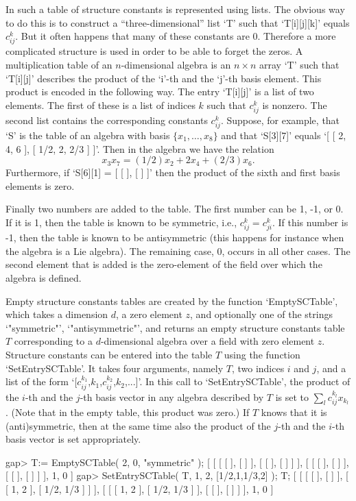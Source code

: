 In {\GAP} such a table of structure constants is represented using 
lists. The obvious way to do this
is to construct a ``three-dimensional'' list `T' such that  
`T[i][j][k]' equals
$c_{ij}^k$. But it often happens that many of these constants are 0.
Therefore a more complicated structure is used in order to be able to 
forget 
the zeros. A multiplication table of an $n$-dimensional algebra is an 
$n\times n$ array `T' such that `T[i][j]' describes the product
of the `i'-th and the `j'-th basis element. This product is encoded
in the following way. The entry `T[i][j]' is a list of two elements. 
The first of these is a list of
indices $k$ such that $c_{ij}^k$ is nonzero. The second list contains the
corresponding constants $c_{ij}^k$. Suppose, for example,  that `S' 
is the table 
of an algebra with basis $\{x_1,\ldots ,x_8\}$ and that `S[3][7]' 
equals `[ [ 2, 4, 6 ], [ 1/2, 2, 2/3 ] ]'. Then in the algebra we 
have the relation 
$$x_3x_7=(1/2) x_2 +2x_4 + (2/3)x_6.$$
Furthermore, if `S[6][1] = [ [  ], [  ] ]' then the product of the
sixth and first basis elements is zero.

Finally two numbers are added to the table. The first number can be
1, -1, or 0. If it is 1, then the table is known to be symmetric,
i.e., $c_{ij}^k=c_{ji}^k$. If this number is -1, then the table is
known to be antisymmetric (this happens for instance when the algebra
is a Lie algebra).
The remaining case, 0, occurs in all other cases. 
The second element that is added is the zero-element of the field over 
which the algebra is defined.  

Empty structure constants tables are created by the function
`EmptySCTable', which takes a dimension $d$, a zero element $z$,
and optionally one of the strings `"symmetric"', `"antisymmetric"',
and returns an empty structure constants table $T$ corresponding to
a $d$-dimensional algebra over a field with zero element $z$.
Structure constants can be entered into the table $T$ using the function
`SetEntrySCTable'.
It takes four arguments, namely $T$, two indices $i$ and $j$,
and a list of the form `[$c_{ij}^{k_1}$,$k_1$,$c_{ij}^{k_2}$,$k_2$,...]'.
In this call to `SetEntrySCTable',
the product of the $i$-th and the $j$-th basis vector
in any algebra described by $T$ is set to $\sum_l c_{ij}^{k_l} x_{k_l}$.
(Note that in the empty table, this product was zero.)
If $T$ knows that it is (anti)symmetric, then at the same time also
the product of the $j$-th and the $i$-th basis vector is set appropriately.

\beginexample
gap> T:= EmptySCTable( 2, 0, "symmetric" );
[ [ [ [  ], [  ] ], [ [  ], [  ] ] ], [ [ [  ], [  ] ], [ [  ], [  ] ] ], 1, 0 ]
gap> SetEntrySCTable( T, 1, 2, [1/2,1,1/3,2] ); T;
[ [ [ [  ], [  ] ], [ [ 1, 2 ], [ 1/2, 1/3 ] ] ], 
[ [ [ 1, 2 ], [ 1/2, 1/3 ] ], [ [  ], [  ] ] ], 1, 0 ]
\endexample


